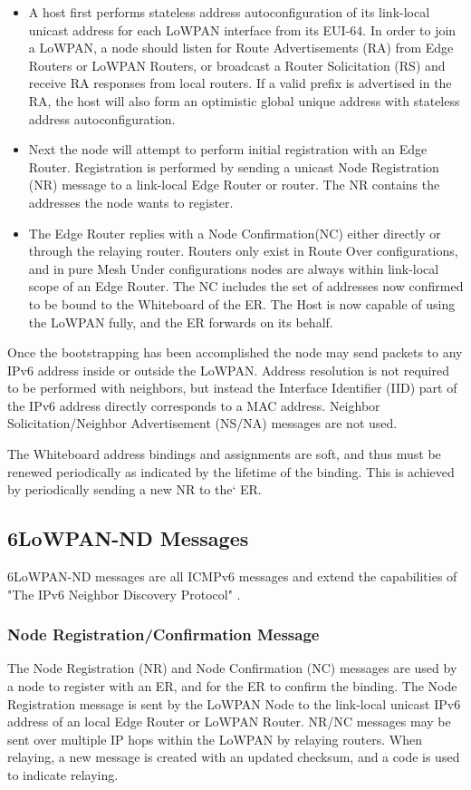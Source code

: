 \documentclass[a4paper,11pt,oneside]{article}
\begin{document}
\begin{itemize}
\item A host first performs stateless address autoconfiguration of its link-local unicast address for each LoWPAN interface from its EUI-64. In order to join a LoWPAN, a node should listen for Route Advertisements (RA) from Edge Routers or LoWPAN Routers, or broadcast a Router Solicitation (RS) and receive RA responses from local routers. If a valid prefix is advertised in the RA, the host will also form an optimistic global unique address with stateless address autoconfiguration.

\item Next the node will attempt to perform initial registration with an Edge Router. Registration is performed by sending a unicast Node Registration (NR) message to a link-local Edge Router  or router. The NR contains the addresses the node wants to register.

\item The Edge Router replies with a Node Confirmation(NC) either  directly or through the relaying router. Routers only exist in Route Over configurations, and in pure Mesh Under configurations nodes are always within link-local scope of an Edge Router. The NC includes the set of addresses now confirmed to be bound to the Whiteboard of the ER.  The Host is now capable of using the LoWPAN fully, and the ER forwards on its behalf.
\end{itemize}

Once the bootstrapping has been accomplished the node may send packets to any IPv6 address inside or outside the LoWPAN. Address resolution is not required to be performed with neighbors, but instead the Interface Identifier (IID) part of the IPv6 address directly corresponds to a MAC address.  Neighbor Solicitation/Neighbor Advertisement (NS/NA) messages are not used.

The Whiteboard address bindings and assignments are soft, and thus must be renewed periodically as indicated by the lifetime of the binding.  This is achieved by periodically sending a new NR to the` ER.

\subsection{6LoWPAN-ND Messages}
6LoWPAN-ND  messages are all ICMPv6 \cite{rfc4443} messages and extend the capabilities of "The IPv6 Neighbor Discovery Protocol" \cite{rfc4861}.

\subsubsection{Node Registration/Confirmation Message}
The Node Registration (NR) and Node Confirmation (NC) messages are used by a node to register with an ER, and for the ER to confirm the binding. The Node Registration message is sent by the LoWPAN Node to the link-local unicast IPv6 address of an local Edge Router or LoWPAN Router. NR/NC messages may be sent over multiple IP hops within the LoWPAN by relaying routers. When relaying, a new message is created with an updated checksum, and a code is used to indicate relaying.  
\end{document}
